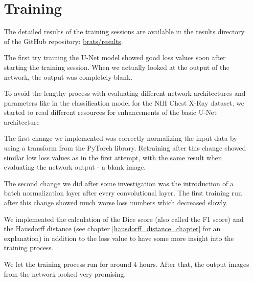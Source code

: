 \section{Training}
The detailed results of the training sessions are available in the results directory of the GitHub repository: \href{https://github.com/andef4/thesis-code/tree/master/brats/results/}{brats/results}.

The first try training the U-Net model showed good loss values soon after starting the training session. When we actually looked at the output of the network, the output was completely blank.

To avoid the lengthy process with evaluating different network architectures and parameters like in the classification model for the NIH Chest X-Ray dataset, we started to read different resources for enhancements of the basic U-Net architecture

The first change we implemented was correctly normalizing the input data by using a transform from the PyTorch library.
Retraining after this change showed similar low loss values as in the first attempt, with the same result when evaluating the network output - a blank image.

The second change we did after some investigation was the introduction of a batch normalization layer after every convolutional layer. The first training run after this change showed much worse loss numbers which decreased slowly.

We implemented the calculation of the Dice score (also called the F1 score) and the Hausdorff distance (see chapter \ref{hausdorff_distance_chapter} for an explanation) in addition to the loss value to have some more insight into the training process.

We let the training process run for around 4 hours. After that, the output images from the network looked very promising.
